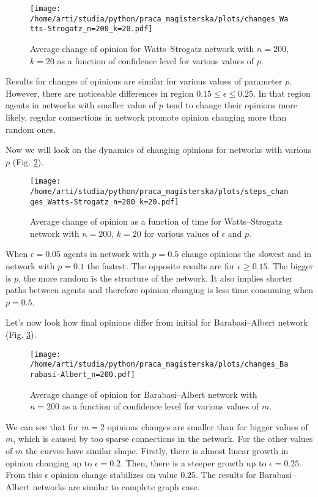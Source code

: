 \documentclass[a4paper, 12pt]{article}
\begin{document}
\begin{figure}[H]
		\centering
		\texttt{[image: /home/arti/studia/python/praca\_magisterska/plots/changes\_Watts-Strogatz\_n=200\_k=20.pdf]}
		\caption{Average change of opinion for Watts--Strogatz network with $n=200$, $k=20$ as a function of confidence level for various values of $p$.}
		\label{f20}
\end{figure}

Results for changes of opinions are similar for various values of parameter $p$. However, there are noticeable differences in region $0.15 \leq \epsilon \leq 0.25$. In that region agents in networks with smaller value of $p$ tend to change their opinions more likely, regular connections in network promote opinion changing more than random ones.

\indent

Now we will look on the dynamics of changing opinions for networks with various $p$ (Fig. \ref{f21}).


\begin{figure}[H]
		\centering
		\texttt{[image: /home/arti/studia/python/praca\_magisterska/plots/steps\_changes\_Watts-Strogatz\_n=200\_k=20.pdf]}
		\caption{Average change of opinion as a function of time for Watts--Strogatz network with $n=200$, $k=20$ for various values of $\epsilon$ and $p$.}
		\label{f21}
\end{figure}

When $\epsilon=0.05$ agents in network with $p=0.5$ change opinions the slowest and in network with $p=0.1$ the fastest. The opposite results are for $\epsilon \geq 0.15$. The bigger is $p$, the more random is the structure of the network. It also implies shorter paths between agents and therefore opinion changing is less time consuming when $p=0.5$.

\indent

Let's now look how final opinions differ from initial for Barabasi--Albert network (Fig. \ref{f22}).

\begin{figure}[H]
		\centering
		\texttt{[image: /home/arti/studia/python/praca\_magisterska/plots/changes\_Barabasi-Albert\_n=200.pdf]}
		\caption{Average change of opinion for Barabasi--Albert network with $n=200$ as a function of confidence level for various values of $m$.}
		\label{f22}
\end{figure}

We can see that for $m=2$ opinions changes are smaller than for bigger values of $m$, which is caused by too sparse connections in the network. For the other values of $m$ the curves have similar shape. Firstly, there is almost linear growth in opinion changing up to $\epsilon=0.2$. Then, there is a steeper growth up to $\epsilon=0.25$. From this $\epsilon$ opinion change stabilizes on value $0.25$. The results for Barabasi--Albert networks are similar to complete graph case.
\end{document}
